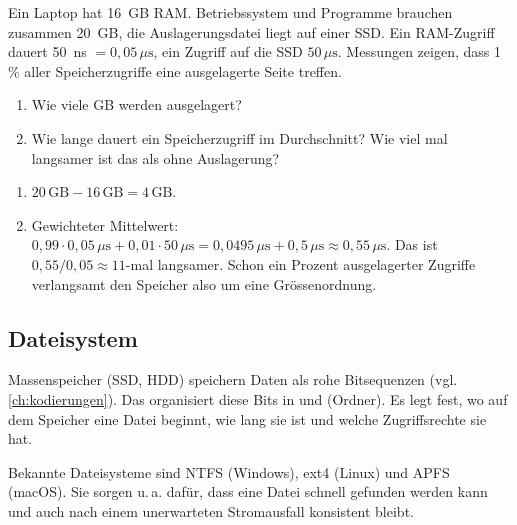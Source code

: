 \begin{myexercise}\label{myexercise:swap}
    Ein Laptop hat 16~GB \gls{RAM}. Betriebssystem und Programme brauchen zusammen 20~GB, die Auslagerungsdatei liegt auf einer \gls{SSD}. Ein RAM-Zugriff dauert 50~ns $= 0{,}05\,\mu\mathrm{s}$, ein Zugriff auf die \gls{SSD} $50\,\mu\mathrm{s}$. Messungen zeigen, dass 1\,\% aller Speicherzugriffe eine ausgelagerte Seite treffen.
    \begin{enumerate}
        \item Wie viele GB werden ausgelagert?
        \item Wie lange dauert ein Speicherzugriff im Durchschnitt? Wie viel mal langsamer ist das als ohne Auslagerung?
    \end{enumerate}
    \begin{myanswer}
        \begin{enumerate}
            \item $20\,\mathrm{GB} - 16\,\mathrm{GB} = 4\,\mathrm{GB}$.
            \item Gewichteter Mittelwert: $0{,}99 \cdot 0{,}05\,\mu\mathrm{s} + 0{,}01 \cdot 50\,\mu\mathrm{s} = 0{,}0495\,\mu\mathrm{s} + 0{,}5\,\mu\mathrm{s} \approx 0{,}55\,\mu\mathrm{s}$. Das ist $0{,}55 / 0{,}05 \approx 11$-mal langsamer. Schon ein Prozent ausgelagerter Zugriffe verlangsamt den Speicher also um eine Grössenordnung.
        \end{enumerate}
    \end{myanswer}
\end{myexercise}

\subsection{Dateisystem}

Massenspeicher (\gls{SSD}, \gls{HDD}) speichern Daten als rohe Bitsequenzen (vgl. \cref{ch:kodierungen}). Das  organisiert diese Bits in  und  (Ordner). Es legt fest, wo auf dem Speicher eine Datei beginnt, wie lang sie ist und welche Zugriffsrechte sie hat.

\begin{myexample}[Dateisysteme]
    Bekannte Dateisysteme sind NTFS (Windows), ext4 (Linux) und APFS (macOS). Sie sorgen u.\,a. dafür, dass eine Datei schnell gefunden werden kann und auch nach einem unerwarteten Stromausfall konsistent bleibt.
\end{myexample}

